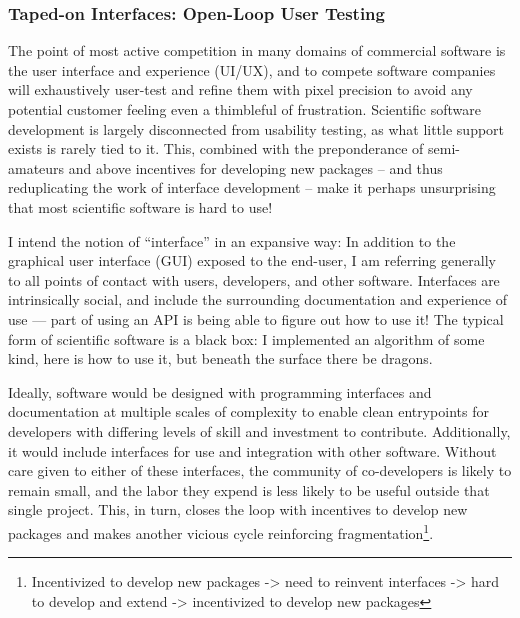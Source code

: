 \documentclass[10pt]{article}
\begin{document}
\begin{multicols}{2}
\hypertarget{taped-on-interfaces-open-loop-user-testing}{%
\subsubsection{Taped-on Interfaces: Open-Loop User
Testing}\label{taped-on-interfaces-open-loop-user-testing}}

The point of most active competition in many domains of commercial
software is the user interface and experience (UI/UX), and to compete
software companies will exhaustively user-test and refine them with
pixel precision to avoid any potential customer feeling even a
thimbleful of frustration. Scientific software development is largely
disconnected from usability testing, as what little support exists is
rarely tied to it. This, combined with the preponderance of
semi-amateurs and above incentives for developing new packages -- and
thus reduplicating the work of interface development -- make it perhaps
unsurprising that most scientific software is hard to use!

I intend the notion of ``interface'' in an expansive way: In addition to
the graphical user interface (GUI) exposed to the end-user, I am
referring generally to all points of contact with users, developers, and
other software. Interfaces are intrinsically social, and include the
surrounding documentation and experience of use --- part of using an API
is being able to figure out how to use it! The typical form of
scientific software is a black box: I implemented an algorithm of some
kind, here is how to use it, but beneath the surface there be dragons.

Ideally, software would be designed with programming interfaces and
documentation at multiple scales of complexity to enable clean
entrypoints for developers with differing levels of skill and investment
to contribute. Additionally, it would include interfaces for use and
integration with other software. Without care given to either of these
interfaces, the community of co-developers is likely to remain small,
and the labor they expend is less likely to be useful outside that
single project. This, in turn, closes the loop with incentives to
develop new packages and makes another vicious cycle reinforcing
fragmentation\footnote{Incentivized to develop new packages
  -\textgreater{} need to reinvent interfaces -\textgreater{} hard to
  develop and extend -\textgreater{} incentivized to develop new
  packages}.

\hypertarget{platforms-industry-capture-and-the-profit-motive}{%
}
\end{multicols}
\end{document}
